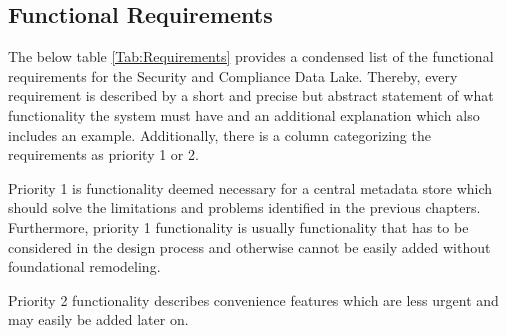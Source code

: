 \subsection{Functional Requirements}
The below table \ref{Tab:Requirements} provides a condensed list of the functional requirements for the Security and Compliance Data Lake. Thereby, every requirement is described by a short and precise but abstract statement of what functionality the system must have and an additional explanation which also includes an example. Additionally, there is a column categorizing the requirements as priority 1 or 2.\par 
Priority 1 is functionality deemed necessary for a central metadata store which should solve the limitations and problems identified in the previous chapters. Furthermore, priority 1 functionality is usually functionality that has to be considered in the design process and otherwise cannot be easily added without foundational remodeling.\par
Priority 2 functionality describes convenience features which are less urgent and may easily be added later on.
